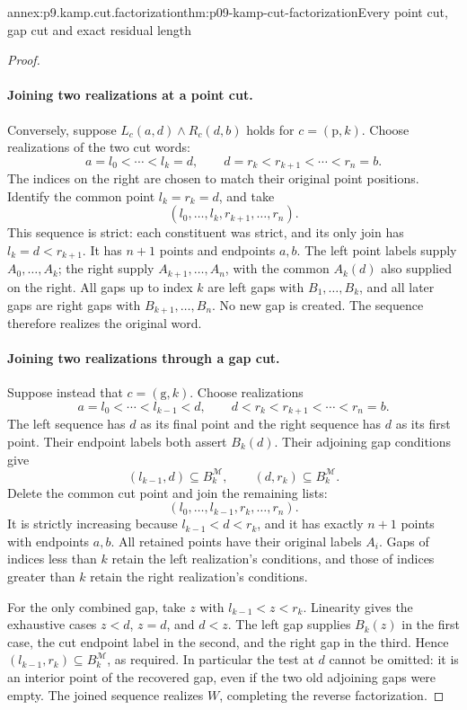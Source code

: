 \begin{annexitem}{annex:p9.kamp.cut.factorization}{thm:p09-kamp-cut-factorization}{Every point cut, gap cut and exact residual length}
\begin{proof}
\paragraph{Joining two realizations at a point cut.}
Conversely, suppose \(L_c(a,d)\land R_c(d,b)\) holds for
\(c=(\mathrm p,k)\). Choose realizations of the two cut words:
\[
       a=l_0<\cdots<l_k=d,
       \qquad d=r_k<r_{k+1}<\cdots<r_n=b.
\]
The indices on the right are chosen to match their original point
positions. Identify the common point \(l_k=r_k=d\), and take
\[
                         (l_0,\ldots,l_k,r_{k+1},\ldots,r_n).
\]
This sequence is strict: each constituent was strict, and its only
join has \(l_k=d<r_{k+1}\). It has \(n+1\) points and
endpoints \(a,b\). The left point labels supply
\(A_0,\ldots,A_k\); the right supply
\(A_{k+1},\ldots,A_n\), with the common \(A_k(d)\)
also supplied on the right. All gaps up to index \(k\) are
left gaps with \(B_1,\ldots,B_k\), and all later gaps are
right gaps with \(B_{k+1},\ldots,B_n\). No new gap is
created. The sequence therefore realizes the original word.

\paragraph{Joining two realizations through a gap cut.}
Suppose instead that \(c=(\mathrm g,k)\). Choose realizations
\[
       a=l_0<\cdots<l_{k-1}<d,
       \qquad d<r_k<r_{k+1}<\cdots<r_n=b.
\]
The left sequence has \(d\) as its final point and the right
sequence has \(d\) as its first point. Their endpoint labels
both assert \(B_k(d)\). Their adjoining gap conditions give
\[
       (l_{k-1},d)\subseteq B_k^{\mathcal M},\qquad
       (d,r_k)\subseteq B_k^{\mathcal M}.
\]
Delete the common cut point and join the remaining lists:
\[
                         (l_0,\ldots,l_{k-1},r_k,\ldots,r_n).
\]
It is strictly increasing because \(l_{k-1}<d<r_k\), and
it has exactly \(n+1\) points with endpoints \(a,b\).
All retained points have their original labels \(A_i\).
Gaps of indices less than \(k\) retain the left realization's
conditions, and those of indices greater than \(k\) retain
the right realization's conditions.

For the only combined gap, take \(z\) with
\(l_{k-1}<z<r_k\). Linearity gives the exhaustive cases
\(z<d\), \(z=d\), and \(d<z\). The left gap supplies
\(B_k(z)\) in the first case, the cut endpoint label in the
second, and the right gap in the third. Hence
\((l_{k-1},r_k)\subseteq B_k^{\mathcal M}\), as required.
In particular the test at \(d\) cannot be omitted: it is an
interior point of the recovered gap, even if the two old adjoining
gaps were empty. The joined sequence realizes \(W\), completing
the reverse factorization.


\end{proof}
\end{annexitem}
